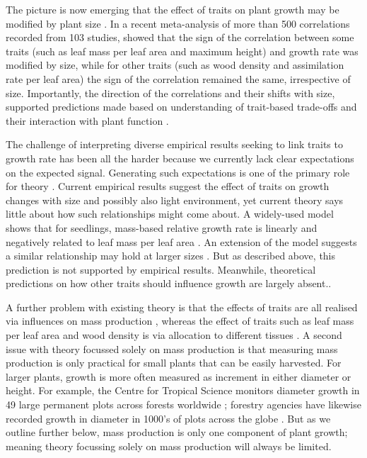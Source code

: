 \documentclass[a4paper,11pt]{article}
\begin{document}
The picture is now emerging that the effect of traits on plant growth may be  modified by plant size \citep{Ruger-2012, Iida-2014, Gibert-2016}. In a recent meta-analysis of more than  500 correlations recorded from 103 studies, \citet{Gibert-2016} showed that the sign of the correlation between some traits (such as leaf mass per leaf area and maximum height) and growth rate was modified by size, while for other traits (such as wood density and assimilation rate per leaf area) the sign of the correlation remained the same, irrespective of size. Importantly, the direction of the correlations and their shifts with size, supported predictions made based on understanding of trait-based trade-offs and their interaction with plant function \citep{Gibert-2016}.

The challenge of interpreting diverse empirical results seeking to link traits to growth rate has been all the harder because we currently lack clear expectations on the expected signal. Generating such expectations is one of the primary role for theory \citep{Kokko-2007}. Current empirical results suggest the effect of traits on growth changes with size and possibly also light environment, yet current theory says little about how such relationships might come about. A widely-used model shows that for seedlings, mass-based relative growth rate is linearly and negatively related to leaf mass per leaf area \citep{Lambers-1992, Cornelissen-1996, Wright-2000}. An extension of the model suggests a similar relationship may hold at larger sizes \citep{Enquist-2007}. But as described above, this prediction is not supported by empirical results. Meanwhile, theoretical predictions on how other traits should influence growth are largely absent..

A further problem with existing theory is that the effects of traits are all realised via influences on mass production \citep{Enquist-2007}, whereas the effect of traits such as leaf mass per leaf area and wood density is via allocation to different tissues \citep{Falster-2011, Gibert-2016}. A second issue with theory focussed solely on mass production is that measuring mass production is only practical for small plants that can be easily harvested. For larger plants, growth is more often measured as increment in either diameter or height. For example, the Centre for Tropical Science monitors diameter growth in 49 large permanent plots across forests worldwide \citep{Anderson-2015}; forestry agencies have likewise recorded growth in diameter in 1000's of plots across the globe \citep{Purves-2008, Kunstler-2015}. But as we outline further below, mass production is only one component of plant growth; meaning theory focussing solely on mass production will always be limited.
\end{document}

